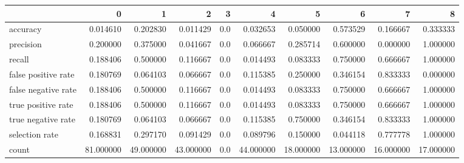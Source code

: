 \begin{tabular}{lrrrrrrrrr}
\toprule
{} &          0 &          1 &          2 &    3 &          4 &          5 &          6 &          7 &          8 \\
\midrule
accuracy            &   0.014610 &   0.202830 &   0.011429 &  0.0 &   0.032653 &   0.050000 &   0.573529 &   0.166667 &   0.333333 \\
precision           &   0.200000 &   0.375000 &   0.041667 &  0.0 &   0.066667 &   0.285714 &   0.600000 &   0.000000 &   1.000000 \\
recall              &   0.188406 &   0.500000 &   0.116667 &  0.0 &   0.014493 &   0.083333 &   0.750000 &   0.666667 &   1.000000 \\
false positive rate &   0.180769 &   0.064103 &   0.066667 &  0.0 &   0.115385 &   0.250000 &   0.346154 &   0.833333 &   0.000000 \\
false negative rate &   0.188406 &   0.500000 &   0.116667 &  0.0 &   0.014493 &   0.083333 &   0.750000 &   0.666667 &   1.000000 \\
true positive rate  &   0.188406 &   0.500000 &   0.116667 &  0.0 &   0.014493 &   0.083333 &   0.750000 &   0.666667 &   1.000000 \\
true negative rate  &   0.180769 &   0.064103 &   0.066667 &  0.0 &   0.115385 &   0.750000 &   0.346154 &   0.833333 &   1.000000 \\
selection rate      &   0.168831 &   0.297170 &   0.091429 &  0.0 &   0.089796 &   0.150000 &   0.044118 &   0.777778 &   1.000000 \\
count               &  81.000000 &  49.000000 &  43.000000 &  0.0 &  44.000000 &  18.000000 &  13.000000 &  16.000000 &  17.000000 \\
\bottomrule
\end{tabular}
